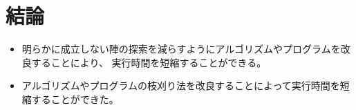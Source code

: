 \section{結論}
\begin{itemize}
\item 明らかに成立しない陣の探索を減らすようにアルゴリズムやプログラムを改良することにより、
	実行時間を短縮することができる。
\item アルゴリズムやプログラムの枝刈り法を改良することによって実行時間を短縮することができた。
\end{itemize}
